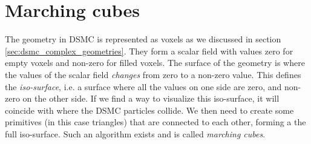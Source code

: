 \section{Marching cubes}
\label{sec:marching_cubes}
The geometry in DSMC is represented as voxels as we discussed in section \ref{sec:dsmc_complex_geometries}. They form a scalar field with values zero for empty voxels and non-zero for filled voxels. The surface of the geometry is where the values of the scalar field \textit{changes} from zero to a non-zero value. This defines the \textit{iso-surface}, i.e. a surface where all the values on one side are zero, and non-zero on the other side. If we find a way to visualize this iso-surface, it will coincide with where the DSMC particles collide. We then need to create some primitives (in this case triangles) that are connected to each other, forming a the full iso-surface. Such an algorithm exists and is called \textit{marching cubes}.

